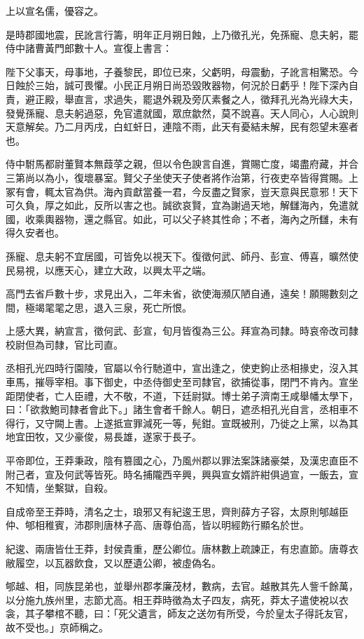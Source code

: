 \begin{pinyinscope}
上以宣名儒，優容之。

是時郡國地震，民訛言行籌，明年正月朔日蝕，上乃徵孔光，免孫寵、息夫躬，罷侍中諸曹黃門郎數十人。宣復上書言：

陛下父事天，母事地，子養黎民，即位已來，父虧明，母震動，子訛言相驚恐。今日蝕於三始，誠可畏懼。小民正月朔日尚恐毀敗器物，何況於日虧乎！陛下深內自責，避正殿，舉直言，求過失，罷退外親及旁仄素餐之人，徵拜孔光為光祿大夫，發覺孫寵、息夫躬過惡，免官遣就國，眾庶歙然，莫不說喜。天人同心，人心說則天意解矣。乃二月丙戌，白虹虷日，連陰不雨，此天有憂結未解，民有怨望未塞者也。

侍中駙馬都尉董賢本無葭莩之親，但以令色諛言自進，賞賜亡度，竭盡府藏，并合三第尚以為小，復壞暴室。賢父子坐使天子使者將作治第，行夜吏卒皆得賞賜。上冢有會，輒太官為供。海內貢獻當養一君，今反盡之賢家，豈天意與民意邪！天下可久負，厚之如此，反所以害之也。誠欲哀賢，宜為謝過天地，解讎海內，免遣就國，收乘輿器物，還之縣官。如此，可以父子終其性命；不者，海內之所讎，未有得久安者也。

孫寵、息夫躬不宜居國，可皆免以視天下。復徵何武、師丹、彭宣、傅喜，曠然使民易視，以應天心，建立大政，以興太平之端。

高門去省戶數十步，求見出入，二年未省，欲使海瀕仄陋自通，遠矣！願賜數刻之間，極竭毣毣之思，退入三泉，死亡所恨。

上感大異，納宣言，徵何武、彭宣，旬月皆復為三公。拜宣為司隸。時哀帝改司隸校尉但為司隸，官比司直。

丞相孔光四時行園陵，官屬以令行馳道中，宣出逢之，使吏鉤止丞相掾史，沒入其車馬，摧辱宰相。事下御史，中丞侍御史至司隸官，欲捕從事，閉門不肯內。宣坐距閉使者，亡人臣禮，大不敬，不道，下廷尉獄。博士弟子濟南王咸舉幡太學下，曰：「欲救鮑司隸者會此下。」諸生會者千餘人。朝日，遮丞相孔光自言，丞相車不得行，又守闕上書。上遂抵宣罪減死一等，髡鉗。宣既被刑，乃徙之上黨，以為其地宜田牧，又少豪俊，易長雄，遂家于長子。

平帝即位，王莽秉政，陰有篡國之心，乃風州郡以罪法案誅諸豪桀，及漢忠直臣不附己者，宣及何武等皆死。時名捕隴西辛興，興與宣女婿許紺俱過宣，一飯去，宣不知情，坐繫獄，自殺。

自成帝至王莽時，清名之士，琅邪又有紀逡王思，齊則薛方子容，太原則郇越臣仲、郇相稚賓，沛郡則唐林子高、唐尊伯高，皆以明經飭行顯名於世。

紀逡、兩唐皆仕王莽，封侯貴重，歷公卿位。唐林數上疏諫正，有忠直節。唐尊衣敝履空，以瓦器飲食，又以歷遺公卿，被虛偽名。

郇越、相，同族昆弟也，並舉州郡孝廉茂材，數病，去官。越散其先人訾千餘萬，以分施九族州里，志節尤高。相王莽時徵為太子四友，病死，莽太子遣使裞以衣衾，其子攀棺不聽，曰：「死父遺言，師友之送勿有所受，今於皇太子得託友官，故不受也。」京師稱之。


\end{pinyinscope}
